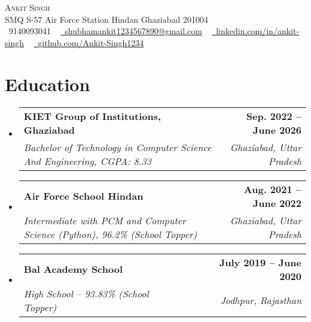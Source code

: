 \documentclass[letterpaper,11pt]{article}
\makeatletter
\newcommand{\resumeSubheading}[4]{
  \vspace{-2pt}\item
    \begin{tabular*}{1.0\textwidth}[t]{l@{\extracolsep{\fill}}r}
      \textbf{#1} & \textbf{\small #2} \\
      \textit{\small#3} & \textit{\small #4} \\
    \end{tabular*}\vspace{-7pt}
}
\newcommand{\resumeSubHeadingListStart}{\begin{itemize}[leftmargin=0.0in, label={}]}
\newcommand{\resumeSubHeadingListEnd}{\end{itemize}}
\makeatother
\begin{document}

\begin{center}
    {\Huge \scshape Ankit Singh} \\ \vspace{1pt}
    SMQ S-57 Air Force Station Hindan Ghaziabad 201004 \\ \vspace{1pt}
    \small \raisebox{-0.1\height}\faPhone\ 9140093041 ~ \href{mailto:x@gmail.com}{\raisebox{-0.2\height}\faEnvelope\  \underline{shubhamankit1234567890@gmail.com}} ~ 
    \href{https://www.linkedin.com/in/ankit-singh-583b1b252//}{\raisebox{-0.2\height}\faLinkedin\ \underline{linkedin.com/in/ankit-singh}}  ~
    \href{https://github.com/Ankit-Singh1234}{\raisebox{-0.2\height}\faGithub\ \underline{github.com/Ankit-Singh1234}}
    \vspace{-8pt}
\end{center}



\section{Education}
\resumeSubHeadingListStart
    \resumeSubheading
      {KIET Group of Institutions, Ghaziabad}{Sep. 2022 -- June 2026}
      {Bachelor of Technology in Computer Science And Engineering, CGPA: 8.33}{Ghaziabad, Uttar Pradesh}
    \resumeSubheading
      {Air Force School Hindan}{Aug. 2021 -- June 2022}
      {Intermediate with PCM and Computer Science (Python), 96.2\% (School Topper)}{Ghaziabad, Uttar Pradesh}
    \resumeSubheading
      {Bal Academy School}{July 2019 -- June 2020}
      {High School – 93.83\% (School Topper)}{Jodhpur, Rajasthan}
\resumeSubHeadingListEnd
\end{document}
